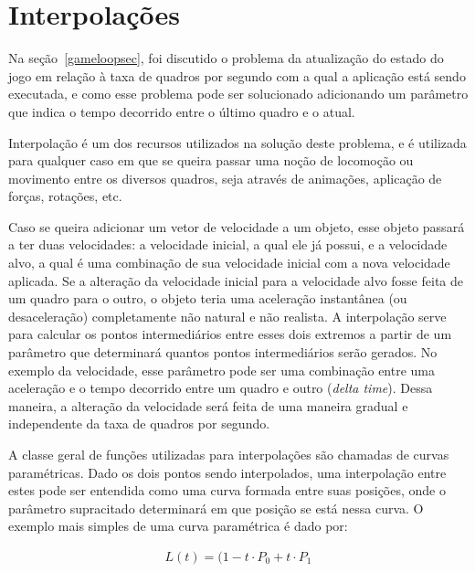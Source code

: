 \section{Interpolações}

Na seção~\ref{gameloopsec}, foi discutido o problema da atualização do estado do jogo em 
relação à taxa de quadros por segundo com a qual a aplicação está sendo executada, e 
como esse problema pode ser solucionado adicionando um parâmetro que indica o tempo 
decorrido entre o último quadro e o atual.

Interpolação é um dos recursos utilizados na solução deste problema, e é utilizada para 
qualquer caso em que se queira passar uma noção de locomoção ou movimento entre os 
diversos quadros, seja através de animações, aplicação de forças, rotações, etc.

Caso se queira adicionar um vetor de velocidade a um objeto, esse objeto passará a ter 
duas velocidades: a velocidade inicial, a qual ele já possui, e a velocidade alvo, a qual 
é uma combinação de sua velocidade inicial com a nova velocidade aplicada. Se a alteração 
da velocidade inicial para a velocidade alvo fosse feita de um quadro para o outro, o 
objeto teria uma aceleração instantânea (ou desaceleração) completamente não natural e 
não realista. A interpolação serve para calcular os pontos intermediários entre esses 
dois extremos a partir de um parâmetro que determinará quantos pontos intermediários 
serão gerados. No exemplo da velocidade, esse parâmetro pode ser uma combinação entre 
uma aceleração e o tempo decorrido entre um quadro e outro (\textit{delta time}). Dessa 
maneira, a alteração da velocidade será feita de uma maneira gradual e independente da 
taxa de quadros por segundo.

A classe geral de funções utilizadas para interpolações são chamadas de curvas 
paramétricas. Dado os dois pontos sendo interpolados, uma interpolação entre estes 
pode ser entendida como uma curva formada entre suas posições, onde o parâmetro 
supracitado determinará em que posição se está nessa curva. O exemplo mais simples de uma 
curva paramétrica é dado por:

\begin{equation}
    \begin{aligned}
        L(t) = (1 - t \cdotp P_0 + t \cdotp P_1
    \end{aligned}
\end{equation}

\vspace{1cm}

